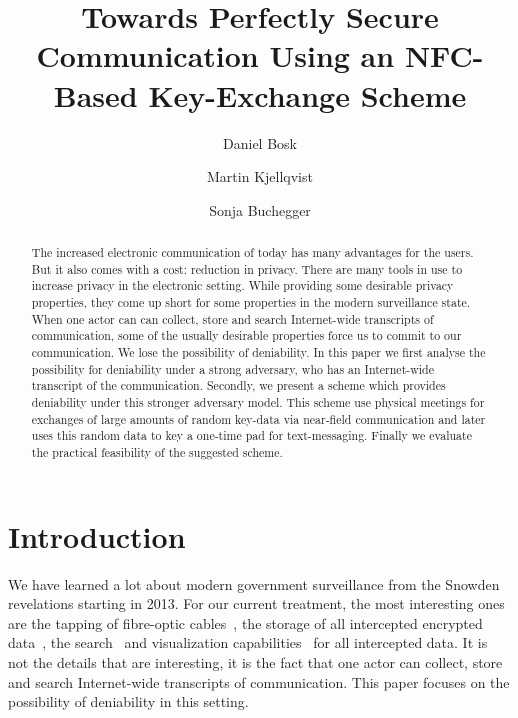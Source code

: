 \title{%
Towards Perfectly Secure Communication Using an NFC-Based Key-Exchange Scheme  
}
\author{%
  Daniel Bosk
  \and
  Martin Kjellqvist
  \and
  Sonja Buchegger
}

\maketitle
\begin{abstract}
  The increased electronic communication of today has many advantages for the 
  users.
  But it also comes with a cost: reduction in privacy.
  There are many tools in use to increase privacy in the electronic setting.
  While providing some desirable privacy properties, they come up short for 
  some properties in the modern surveillance state.
  When one actor can can collect, store and search Internet-wide transcripts of 
  communication, some of the usually desirable properties force us to commit to 
  our communication.
  We lose the possibility of deniability.
  In this paper we first analyse the possibility for deniability under a strong 
  adversary, who has an Internet-wide transcript of the communication.
  Secondly, we present a scheme which provides deniability under this stronger 
  adversary model.
  This scheme use physical meetings for exchanges of large amounts of random 
  key-data via near-field communication and later uses this random data to key 
  a one-time pad for text-messaging.
  Finally we evaluate the practical feasibility of the suggested scheme.

\end{abstract}


\acresetall{}
\section{Introduction}

We have learned a lot about modern government surveillance from the Snowden 
revelations starting in 2013.
For our current treatment, the most interesting ones are the tapping of 
fibre-optic cables~\cite{fibretap}, the storage of all intercepted encrypted 
data~\cite{cryptostore}, the search~\cite{xkeyscore} and visualization 
capabilities~\cite{boundlessinformant} for all intercepted data.
It is not the details that are interesting, it is the fact that one actor can 
collect, store and search Internet-wide transcripts of communication.
This paper focuses on the possibility of deniability in this setting.

